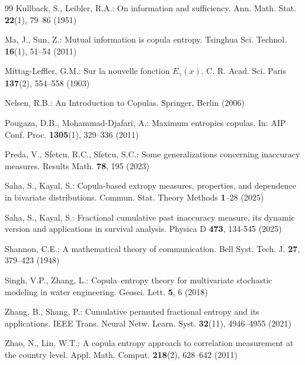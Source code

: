 \documentclass[12pt, a4paper]{article}
\numberwithin{equation}{section}
\begin{document}
\begin{thebibliography}{99}
	 Kullback, S., Leibler, R.A.: On information and sufficiency. Ann. Math. Stat. \textbf{22}(1), 79–86 (1951)
	
	 Ma, J., Sun, Z.: Mutual information is copula entropy. Tsinghua Sci. Technol. \textbf{16}(1), 51–54 (2011)
	
	 Mittag-Leffler, G.M.: Sur la nouvelle fonction $E_\gamma (x)$. C. R. Acad. Sci. Paris \textbf{137}(2), 554–558 (1903)
	
	 Nelsen, R.B.: An Introduction to Copulas. Springer, Berlin (2006)
	
	 Pougaza, D.B., Mohammad-Djafari, A.: Maximum entropies copulas. In: AIP Conf. Proc. \textbf{1305}(1), 329–336 (2011)
	
	 Preda, V., Sfetcu, R.C., Sfetcu, S.C.: Some generalizations concerning inaccuracy measures. Results Math. \textbf{78}, 195 (2023)
	
	 Saha, S., Kayal, S.: Copula-based extropy measures, properties, and dependence in bivariate distributions. Commun. Stat. Theory Methods \textbf{1}–28 (2025)
	
	 Saha, S., Kayal, S.: Fractional cumulative past inaccuracy measure, its dynamic version and applications in survival analysis. Physica D \textbf{473}, 134-545 (2025)
	
	 Shannon, C.E.: A mathematical theory of communication. Bell Syst. Tech. J. \textbf{27}, 379–423 (1948)
	
	 Singh, V.P., Zhang, L.: Copula–entropy theory for multivariate stochastic modeling in water engineering. Geosci. Lett. \textbf{5}, 6 (2018)
	
	 Zhang, B., Shang, P.: Cumulative permuted fractional entropy and its applications. IEEE Trans. Neural Netw. Learn. Syst. \textbf{32}(11), 4946–4955 (2021)
	
	 Zhao, N., Lin, W.T.: A copula entropy approach to correlation measurement at the country level. Appl. Math. Comput. \textbf{218}(2), 628–642 (2011)
	
\end{thebibliography}
\end{document}
